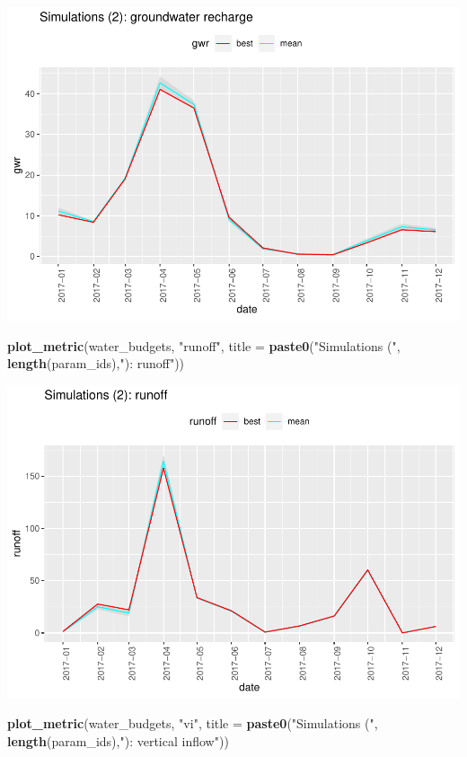 \documentclass[
]{book}
\newenvironment{Shaded}{\begin{snugshade}}{\end{snugshade}}
\newcommand{\AttributeTok}[1]{\textcolor[rgb]{0.13,0.29,0.53}{#1}}
\newcommand{\FunctionTok}[1]{\textcolor[rgb]{0.13,0.29,0.53}{\textbf{#1}}}
\newcommand{\NormalTok}[1]{#1}
\newcommand{\StringTok}[1]{\textcolor[rgb]{0.31,0.60,0.02}{#1}}
\begin{document}
\includegraphics{fig/calib-uncert-gwr-1.pdf}

\begin{Shaded}
\begin{Highlighting}[]
\FunctionTok{plot\_metric}\NormalTok{(water\_budgets, }\StringTok{"runoff"}\NormalTok{, }
            \AttributeTok{title =} \FunctionTok{paste0}\NormalTok{(}\StringTok{"Simulations ("}\NormalTok{, }\FunctionTok{length}\NormalTok{(param\_ids),}\StringTok{"): runoff"}\NormalTok{))}
\end{Highlighting}
\end{Shaded}

\includegraphics{fig/calib-uncert-runoff-1.pdf}

\begin{Shaded}
\begin{Highlighting}[]
\FunctionTok{plot\_metric}\NormalTok{(water\_budgets, }\StringTok{"vi"}\NormalTok{, }
            \AttributeTok{title =} \FunctionTok{paste0}\NormalTok{(}\StringTok{"Simulations ("}\NormalTok{, }\FunctionTok{length}\NormalTok{(param\_ids),}\StringTok{"): vertical inflow"}\NormalTok{))}
\end{Highlighting}
\end{Shaded}
\end{document}
